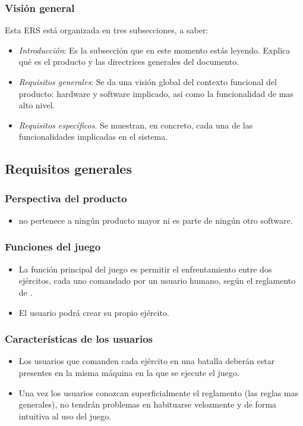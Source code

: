 \subsubsection{Visión general}
Esta ERS está organizada en tres subsecciones, a saber:
\begin{itemize}
\item  \textit{Introducción}: Es la subsección que en este momento
  estás leyendo. Explica qué es el producto y las directrices generales del documento.
\item \textit{Requisitos generales}: Se da una visión global del
  contexto funcional del producto: hardware y software implicado, así
  como la funcionalidad de mas alto nivel.
\item \textit{Requisitos específicos}. Se muestran, en concreto, cada una de las funcionalidades implicadas en el sistema.  
\end{itemize}

\subsection{Requisitos generales}
\subsubsection{Perspectiva del producto}
\begin{itemize}
\item \gom no pertenece a ningún producto mayor ni es parte de ningún otro software.
\end{itemize}

\subsubsection{Funciones del juego}
\begin{itemize}
\item La función principal del juego es permitir el enfrentamiento entre dos ejércitos, cada uno comandado por un usuario humano, según el reglamento de \gomf.
\item El usuario podrá crear su propio ejército.
\end{itemize}

\subsubsection{Características de los usuarios}
\begin{itemize}
\item Los usuarios que comanden cada ejército en una batalla deberán estar presentes en la misma máquina en la que se ejecute el juego.

\item Una vez los usuarios conozcan superficialmente el reglamento (las reglas mas generales), no tendrán problemas en habituarse velozmente y de forma intuitiva al uso del juego.
\end{itemize}

